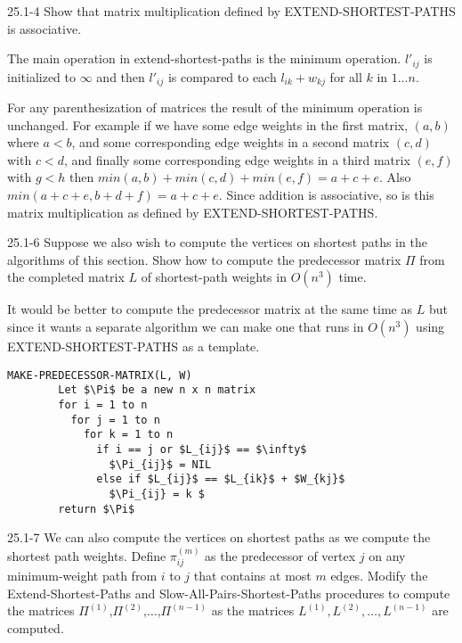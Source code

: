 \begin{problem}{25.1-4}
  Show that matrix multiplication defined by EXTEND-SHORTEST-PATHS is associative.
  \begin{solution}
    The main operation in extend-shortest-paths is the minimum operation. $l'_{ij}$ is initialized to $\infty$ and then $l'_{ij}$ is compared to each $l_{ik} + w_{kj}$ for all $k$ in $1\ldots n$.

    For any parenthesization of matrices the result of the minimum operation is unchanged. For example if we have some
    edge weights in the first matrix, $(a, b)$ where $a < b$, and some corresponding edge weights in a second matrix
    $(c, d)$ with $c < d$, and finally some corresponding edge weights in a third matrix $(e, f)$ with $g < h$ then
    $min(a,b) + min(c,d) + min(e, f) = a + c + e$. Also $min(a + c + e, b + d + f) = a + c + e$.  Since addition is
    associative, so is this matrix multiplication as defined by EXTEND-SHORTEST-PATHS.
  \end{solution}
\end{problem}

\begin{problem}{25.1-6}
  Suppose we also wish to compute the vertices on shortest paths in the algorithms of this section. Show how to compute
  the predecessor matrix $\Pi$ from the completed matrix $L$ of shortest-path weights in $O(n^3)$ time.
  \begin{solution}
    It would be better to compute the predecessor matrix at the same time as $L$ but since it wants a separate algorithm
    we can make one that runs in $O(n^3)$ using EXTEND-SHORTEST-PATHS as a template.
    \begin{lstlisting}[mathescape]
      MAKE-PREDECESSOR-MATRIX(L, W)
        Let $\Pi$ be a new n x n matrix
        for i = 1 to n
          for j = 1 to n
            for k = 1 to n
              if i == j or $L_{ij}$ == $\infty$
                $\Pi_{ij}$ = NIL
              else if $L_{ij}$ == $L_{ik}$ + $W_{kj}$
                $\Pi_{ij} = k $
        return $\Pi$
    \end{lstlisting}
  \end{solution}
\end{problem}

\begin{problem}{25.1-7}
  We can also compute the vertices on shortest paths as we compute the shortest path weights.  Define $\pi^{(m)}_{ij}$
  as the predecessor of vertex $j$ on any minimum-weight path from $i$ to $j$ that contains at most $m$ edges.  Modify
  the Extend-Shortest-Paths and Slow-All-Pairs-Shortest-Paths procedures to compute the matrices
  $\Pi^{(1)}$,$\Pi^{(2)}$,$\ldots$,$\Pi^{(n-1)}$ as the matrices $L^{(1)},L^{(2)},\ldots,L^{(n-1)}$ are computed.
\end{problem}


